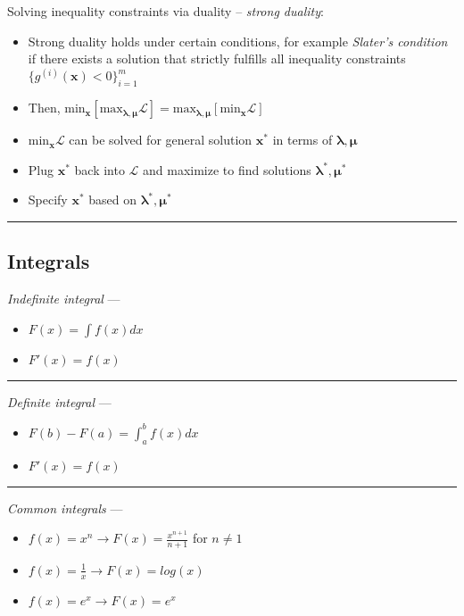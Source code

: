 Solving inequality constraints via duality – \emph{strong duality}:
\begin{itemize}
    \item Strong duality holds under certain conditions, for example \emph{Slater's condition} if there exists a solution that strictly fulfills all inequality constraints $\{g^{(i)}(\boldsymbol{x}) < 0\}_{i=1}^m$
    \item Then, $\textrm{min}_{\boldsymbol{x}} [\textrm{max}_{\boldsymbol{\lambda},\boldsymbol{\mu}} \mathcal{L}] = \textrm{max}_{\boldsymbol{\lambda},\boldsymbol{\mu}} [\textrm{min}_{\boldsymbol{x}} \mathcal{L}]$
    \item $\textrm{min}_{\boldsymbol{x}} \mathcal{L}$ can be solved for general solution $\boldsymbol{x^*}$ in terms of $\boldsymbol{\lambda},\boldsymbol{\mu}$
    \item Plug $\boldsymbol{x^*}$ back into $\mathcal{L}$ and maximize to find solutions $\boldsymbol{\lambda^*},\boldsymbol{\mu^*}$
    \item Specify $\boldsymbol{x^*}$ based on $\boldsymbol{\lambda^*},\boldsymbol{\mu^*}$
\end{itemize}

{\color{black}\hrule height 0.001mm}

\subsection*{Integrals}
\emph{Indefinite integral} --- 
\begin{itemize}
    \item $F(x) = \int f(x) dx$
    \item $F'(x) = f(x)$
\end{itemize}

{\color{lightgray}\hrule height 0.001mm}

\emph{Definite integral} --- 
\begin{itemize}
    \item $F(b) - F(a) = \int_a^b f(x) dx$
    \item $F'(x) = f(x)$
\end{itemize}

{\color{lightgray}\hrule height 0.001mm}

\emph{Common integrals} --- 
\begin{itemize}
    \item $f(x) = x^n \rightarrow F(x) = \frac{x^{n+1}}{n+1}$ for $n \neq 1$
    \item $f(x) = \frac{1}{x} \rightarrow F(x) = log(x)$
    \item $f(x) = e^x \rightarrow F(x) = e^x$
\end{itemize}

